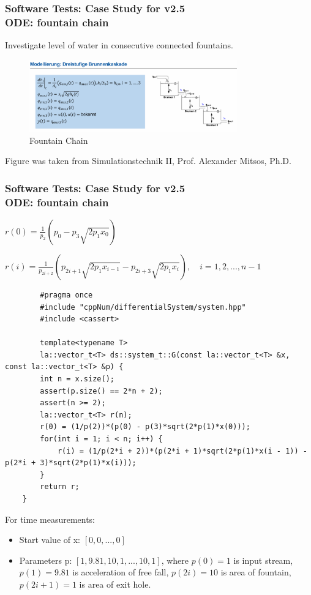 \documentclass[ucs,10pt]{beamer}
\begin{document}
\begin{frame}[fragile]
\frametitle{Software Tests: Case Study for v2.5 \\
	\small \color{rwth-blue} ODE: fountain chain}
	Investigate level of water in consecutive connected fountains.
	\begin{figure}
		\centering
		\includegraphics[width=0.8\textwidth]{figures/fountain_chain.png}
		\caption{Fountain Chain}
	\end{figure}
	{\tiny *Figure was taken from Simulationstechnik II, Prof. Alexander Mitsos, Ph.D.}
\end{frame}
	
\begin{frame}[fragile]
\frametitle{Software Tests: Case Study for v2.5 \\
	\small \color{rwth-blue} ODE: fountain chain}
	$r(0) = \frac{1}{p_2} \left( p_0 - p_3 \sqrt{2 p_1 x_0} \right)$
	
	$r(i) = \frac{1}{p_{2i+2}} \left( p_{2i+1} \sqrt{2 p_1 x_{i-1}} - p_{2i+3} \sqrt{2 p_1 x_i} \right), \quad i = 1, 2, ..., n-1$
	\begin{lstlisting}
		#pragma once
		#include "cppNum/differentialSystem/system.hpp"
		#include <cassert>
		
		template<typename T>
		la::vector_t<T> ds::system_t::G(const la::vector_t<T> &x, const la::vector_t<T> &p) {
		int n = x.size();
		assert(p.size() == 2*n + 2);
		assert(n >= 2);
		la::vector_t<T> r(n);
		r(0) = (1/p(2))*(p(0) - p(3)*sqrt(2*p(1)*x(0)));
		for(int i = 1; i < n; i++) {
			r(i) = (1/p(2*i + 2))*(p(2*i + 1)*sqrt(2*p(1)*x(i - 1)) - p(2*i + 3)*sqrt(2*p(1)*x(i)));
		}
		return r;
	}
	\end{lstlisting}
	For time measurements:
        \begin{itemize}
                \item Start value of x: $[0, 0, ..., 0]$
		\item Parameters p: $[1, 9.81, 10, 1, ..., 10, 1]$, where $p(0)=1$ is input stream, $p(1)=9.81$ is acceleration of free fall, $p(2i)=10$ is area of fountain, $p(2i+1)=1$ is area of exit hole.
        \end{itemize}
\end{frame}
		
\end{document}
